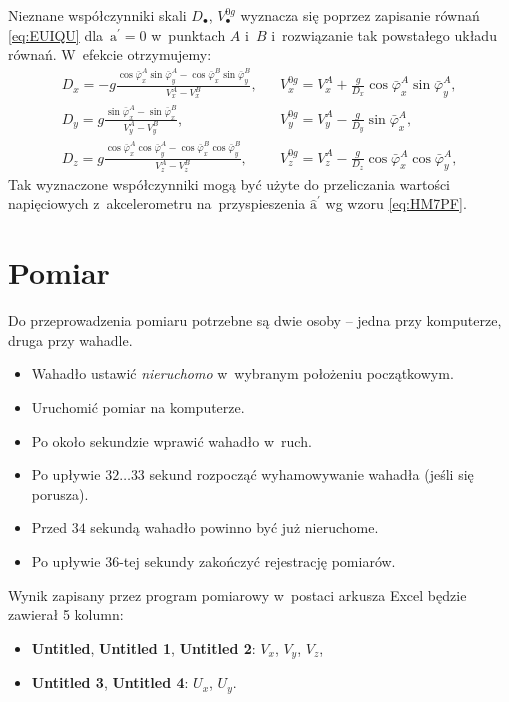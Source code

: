 \documentclass[paper=a4,DIV=12]{lpas}
\newcommand{\brm}[1]{\bm{\mathrm{#1}}}
\begin{document}
Nieznane współczynniki skali $D_{\bullet}$, $V_{\bullet}^{0g}$ wyznacza się
poprzez zapisanie równań \eqref{eq:EUIQU} dla~$\brm{a}^{\prime} = \brm{0}$
w~punktach $A$ i~$B$ i~rozwiązanie tak powstałego układu równań. W~efekcie
otrzymujemy:
\begin{subequations}
  \label{eq:GN30K}
  \begin{align}
    & D_x = -g \frac{ \cos{\bar{\varphi}_x^A}\sin{\bar{\varphi}_y^A} -\cos{\bar{\varphi}_x^B}\sin{\bar{\varphi}_y^B} }
                    { V_x^A - V_x^B }, &
    & V_x^{0g} = V_x^A +\frac{g}{D_x} \cos{\bar{\varphi}_x^A}\sin{\bar{\varphi}_y^A}, &
    \label{eq:L8MQV}
    \\
    & D_y = g \frac{ \sin{\bar{\varphi}_x^A} - \sin{\bar{\varphi}_x^B} }
                   { V_y^A - V_y^B }, &
    & V_y^{0g} = V_y^A - \frac{g}{D_y}\sin{\bar{\varphi}_x^A}, &
    \label{eq:OAGGF}
    \\
    & D_z = g \frac{ \cos{\bar{\varphi}_x^A}\cos{\bar{\varphi}_y^A} -\cos{\bar{\varphi}_x^B}\cos{\bar{\varphi}_y^B} }
                    { V_z^A - V_z^B }, &
    & V_z^{0g} = V_z^A - \frac{g}{D_z} \cos{\bar{\varphi}_x^A}\cos{\bar{\varphi}_y^A}, &
    \label{eq:JZ38T}
  \end{align}
\end{subequations}
Tak wyznaczone współczynniki mogą być użyte do przeliczania wartości
napięciowych z~akcelerometru na~przyspieszenia $\hat{\brm{a}}^{\prime}$
wg wzoru \eqref{eq:HM7PF}.

\section{Pomiar}
\label{sec:CKUHT}

Do przeprowadzenia pomiaru potrzebne są dwie osoby -- jedna przy komputerze,
druga przy wahadle.
\begin{itemize}
  \item Wahadło ustawić {\em nieruchomo} w~wybranym położeniu początkowym.
  \item Uruchomić pomiar na komputerze.
  \item Po około sekundzie wprawić wahadło w~ruch.
  \item Po upływie $32\dots33$ sekund rozpocząć wyhamowywanie wahadła (jeśli się porusza).
  \item Przed $34$ sekundą wahadło powinno być już nieruchome.
  \item Po upływie $36$-tej sekundy zakończyć rejestrację pomiarów.
\end{itemize}
Wynik zapisany przez program pomiarowy w~postaci arkusza Excel będzie zawierał
5 kolumn:
\begin{itemize}
  \item \textbf{Untitled}, \textbf{Untitled 1}, \textbf{Untitled 2}: $V_x$, $V_y$, $V_z$,
  \item \textbf{Untitled 3}, \textbf{Untitled 4}: $U_x$, $U_y$.
\end{itemize}
\end{document}
